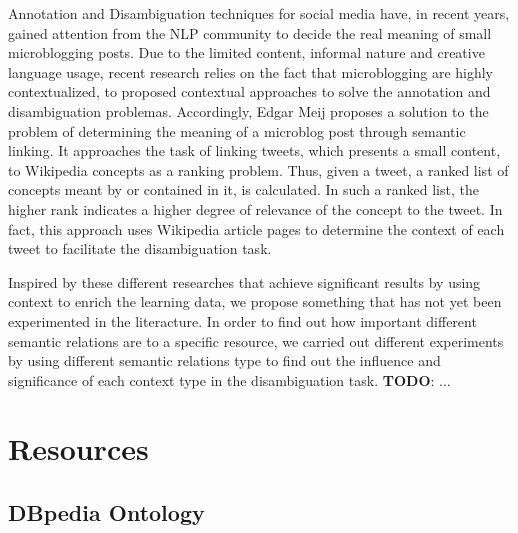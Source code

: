 \documentclass[10pt,a4paper]{article}
\newcommand{\todo}[1]{{\color{red}\textsf{\textbf{TODO}}: #1}}
\begin{document}
Annotation and Disambiguation techniques for social media have, in recent years, gained attention from the NLP community to decide the real meaning of small microblogging posts. Due to the limited content, informal nature and creative language usage, recent research relies on the fact that microblogging are  highly contextualized, to proposed contextual approaches to solve the annotation and disambiguation problemas. Accordingly,  Edgar Meij
 proposes a solution to the problem of determining the meaning of a microblog post through semantic linking. It approaches the task of linking tweets, which presents a small content,  to Wikipedia concepts as a ranking problem. Thus,  given a tweet,  a ranked list of concepts meant by or contained in it, is calculated. In such a ranked list, the higher rank indicates a higher degree of relevance of the concept to the tweet. In fact, this approach uses Wikipedia article pages to determine the context of each tweet to facilitate the disambiguation task.


Inspired by these different researches that achieve significant results by using context to enrich the learning data, we  propose something that has not yet been experimented in the literacture. In order to find out how important different semantic relations are to a specific resource, we carried out different experiments by using different semantic relations type to find out the influence and significance of each context type in the disambiguation task. \todo{...}



\section{Resources}


\subsection{DBpedia Ontology} 
\end{document}
